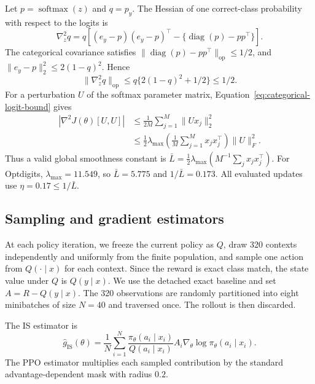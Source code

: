Let $p=\operatorname{softmax}(z)$ and $q=p_y$. The Hessian of one correct-class probability with respect to the logits is
\begin{equation}
 \nabla_z^2q
 =q\left[
 (e_y-p)(e_y-p)^\top-\{\operatorname{diag}(p)-pp^\top\}
 \right].
 \label{eq:categorical-logit-hessian}
\end{equation}
The categorical covariance satisfies $\|\operatorname{diag}(p)-pp^\top\|_{\mathrm{op}}\le1/2$, and $\|e_y-p\|_2^2\le2(1-q)^2$. Hence
\begin{equation}
 \|\nabla_z^2q\|_{\mathrm{op}}
 \le q\{2(1-q)^2+1/2\}
 \le1/2.
 \label{eq:categorical-logit-bound}
\end{equation}
For a perturbation $U$ of the softmax parameter matrix, Equation~\eqref{eq:categorical-logit-bound} gives
\begin{align}
 \left|\nabla^2J(\theta)[U,U]\right|
 &\le\frac{1}{2M}\sum_{j=1}^M\|Ux_j\|_2^2
 \nonumber\\
 &\le\frac12\lambda_{\max}\left(
 \frac1M\sum_{j=1}^Mx_jx_j^\top
 \right)\|U\|_F^2.
 \label{eq:categorical-smoothness-bound}
\end{align}
Thus a valid global smoothness constant is $\bar L=\tfrac12\lambda_{\max}(M^{-1}\sum_jx_jx_j^\top)$. For Optdigits, $\lambda_{\max}=11.549$, so $\bar L=5.775$ and $1/\bar L=0.173$. All evaluated updates use $\eta=0.17\le1/\bar L$.

\subsection{Sampling and gradient estimators}

At each policy iteration, we freeze the current policy as $Q$, draw 320 contexts independently and uniformly from the finite population, and sample one action from $Q(\cdot\mid x)$ for each context. Since the reward is exact class match, the state value under $Q$ is $Q(y\mid x)$. We use the detached exact baseline and set $A=R-Q(y\mid x)$. The 320 observations are randomly partitioned into eight minibatches of size $N=40$ and traversed once. The rollout is then discarded.

The IS estimator is
\begin{equation}
 \widehat g_{\mathrm{IS}}(\theta)
 =\frac1N\sum_{i=1}^N
 \frac{\pi_\theta(a_i\mid x_i)}{Q(a_i\mid x_i)}
 A_i\nabla_\theta\log\pi_\theta(a_i\mid x_i).
 \label{eq:categorical-is-gradient}
\end{equation}
The PPO estimator multiplies each sampled contribution by the standard advantage-dependent mask with radius $0.2$.

